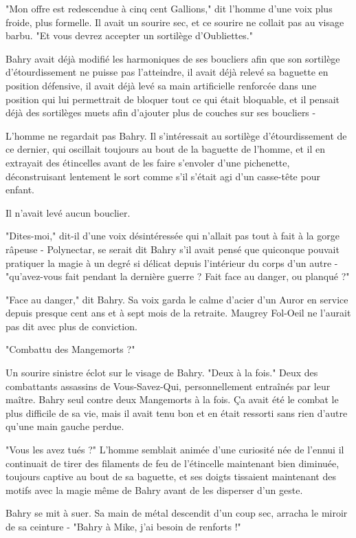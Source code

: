 "Mon offre est redescendue à cinq cent Gallions," dit l'homme d'une voix plus froide, plus formelle. Il avait un sourire sec, et ce sourire ne collait pas au visage barbu. "Et vous devrez accepter un sortilège d'Oubliettes."

Bahry avait déjà modifié les harmoniques de ses boucliers afin que son sortilège d'étourdissement ne puisse pas l'atteindre, il avait déjà relevé sa baguette en position défensive, il avait déjà levé sa main artificielle renforcée dans une position qui lui permettrait de bloquer tout ce qui était bloquable, et il pensait déjà des sortilèges muets afin d'ajouter plus de couches sur ses boucliers -

L'homme ne regardait pas Bahry. Il s'intéressait au sortilège d'étourdissement de ce dernier, qui oscillait toujours au bout de la baguette de l'homme, et il en extrayait des étincelles avant de les faire s'envoler d'une pichenette, déconstruisant lentement le sort comme s'il s'était agi d'un casse-tête pour enfant.

Il n'avait levé aucun bouclier.

"Dites-moi," dit-il d'une voix désintéressée qui n'allait pas tout à fait à la gorge râpeuse - Polynectar, se serait dit Bahry s'il avait pensé que quiconque pouvait pratiquer la magie à un degré si délicat depuis l'intérieur du corps d'un autre - "qu'avez-vous fait pendant la dernière guerre ? Fait face au danger, ou planqué ?"

"Face au danger," dit Bahry. Sa voix garda le calme d'acier d'un Auror en service depuis presque cent ans et à sept mois de la retraite. Maugrey Fol-Oeil ne l'aurait pas dit avec plus de conviction.

"Combattu des Mangemorts ?"

Un sourire sinistre éclot sur le visage de Bahry. "Deux à la fois." Deux des combattants assassins de Vous-Savez-Qui, personnellement entraînés par leur maître. Bahry seul contre deux Mangemorts à la fois. Ça avait été le combat le plus difficile de sa vie, mais il avait tenu bon et en était ressorti sans rien d'autre qu'une main gauche perdue.

"Vous les avez tués ?" L'homme semblait animée d'une curiosité née de l'ennui il continuait de tirer des filaments de feu de l'étincelle maintenant bien diminuée, toujours captive au bout de sa baguette, et ses doigts tissaient maintenant des motifs avec la magie même de Bahry avant de les disperser d'un geste.

Bahry se mit à suer. Sa main de métal descendit d'un coup sec, arracha le miroir de sa ceinture - "Bahry à Mike, j'ai besoin de renforts !"

